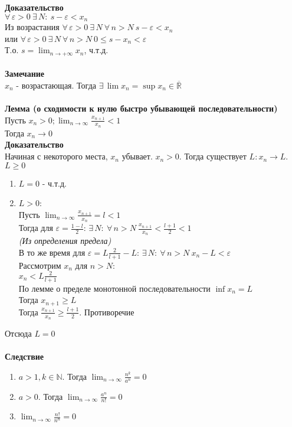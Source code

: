 \documentclass[12pt]{article}
\begin{document}
\textbf{Доказательство}\\
$\forall\,\varepsilon>0\ \exists\,N:\ s-\varepsilon<x_n$\\
Из возрастания $\forall\,\varepsilon>0\ \exists\,N\ \forall\,n>N\ s-\varepsilon<x_n$\\
или $\forall\,\varepsilon>0\ \exists\,N\ \forall\,n>N\ 0 \leq s-x_n<\varepsilon$\\
Т.о. $s = \lim_{n\rightarrow +\infty} x_n$, ч.т.д.\\\\
\textbf{Замечание}\\
$x_n$ - возрастающая. Тогда $\exists\,\lim x_n = \sup x_n \in \overline{\mathbb{R}}$\\\\
\textbf{Лемма (о сходимости к нулю быстро убывающей последовательности)}\\
Пусть $x_n>0; \lim_{n\rightarrow\infty}\frac{x_{n+1}}{x_n} < 1$\\
Тогда $x_n \rightarrow 0$\\
\textbf{Доказательство}\\
Начиная с некоторого места, $x_n$ убывает. $x_n > 0$. Тогда существует $L: x_n \rightarrow L$.\\
$L \geq 0$
\begin{enumerate}
    \item $L = 0$ - ч.т.д.
    \item $L > 0$:\\
    Пусть $\lim_{n\rightarrow\infty}\frac{x_{n+1}}{x_n} = l < 1$\\
Тогда для $\varepsilon = \frac{1-l}{2}$: $\exists\, N:\ \forall\,n>N\ \frac{x_{n+1}}{x_n} < \frac{l+1}2 < 1$\\
    \textit{(Из определения предела)}\\
    В то же время для $\varepsilon = L\frac2{l+1}-L$: $\exists\, N:\ \forall\,n>N\ x_n-L < \varepsilon$\\
    Рассмотрим $x_n$ для $n>N$:\\
    $x_n < L\frac2{l+1}$\\
    По лемме о пределе монотонной последовательности $\inf x_n = L$\\
    Тогда $x_{n+1} \geq L$\\
    Тогда $\frac {x_{n+1}}{x_n} \geq \frac{l+1}2$. Противоречие\\
\end{enumerate}
Отсюда $L = 0$\\\\
\textbf{Следствие}
\begin{enumerate}
    \item $a>1, k \in \mathbb{N}$. Тогда $\lim_{n\rightarrow \infty} \frac{n^k}{a^n} = 0$
    \item $a>0$. Тогда $\lim_{n\rightarrow \infty} \frac{a^n}{n!} = 0$
    \item $\lim_{n\rightarrow \infty} \frac{n!}{n^n} = 0$
\end{enumerate}
\end{document}
